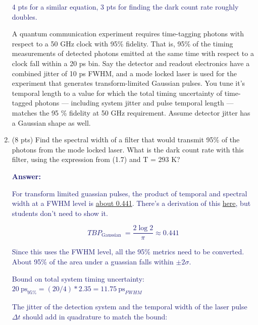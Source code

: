 \documentclass[11pt]{caltech_thesis} %
\begin{document}
\begin{enumerate}
  \textcolor{midnightblue}{4 pts for a similar equation, 3 pts for
  finding the dark count rate roughly doubles. }

  A quantum communication experiment requires time-tagging photons with
  respect to a 50 GHz clock with 95\% fidelity. That is, 95\% of the
  timing measurements of detected photons emitted at the same time with
  respect to a clock fall within a 20 ps bin. Say the detector and
  readout electronics have a combined jitter of 10 ps FWHM, and a mode
  locked laser is used for the experiment that generates
  transform-limited Gaussian pulses. You tune it's temporal length to a
  value for which the total timing uncertainty of time-tagged photons
  --- including system jitter and pulse temporal length --- matches the
  95 \% fidelity at 50 GHz requirement. Assume detector jitter has a
  Gaussian shape as well.
\item
  (8 pts) Find the spectral width of a filter that would transmit 95\%
  of the photons from the mode locked laser. What is the dark count rate
  with this filter, using the expression from (1.7) and T = 293 K?

  \textcolor{midnightblue}{ \textbf{Answer:} }

  \textcolor{midnightblue}{For transform limited guassian pulses, the
  product of temporal and spectral width at a FWHM level is
  \href{https://www.lasercalculator.com/transform-limited-pulse-calculator/}{about
  0.441}. There's a derivation of this
  \href{https://www.physicsforums.com/threads/time-bandwidth-product-ideal-mode-locking.171404/post-1339948}{here},
  but students don't need to show it. }

  \textcolor{midnightblue}{

  $$T B P_{\text {Gaussian }}=\frac{2 \log 2}{\pi} \approx 0.441$$

  }

  \textcolor{midnightblue}{ Since this uses the FWHM level, all the 95\%
  metrics need to be converted. About 95\% of the area under a guassian
  falls within $\pm 2 \sigma$. }

  \textcolor{midnightblue}{ Bound on total system timing uncertainty:
  $20~\text{ps}_{95\%} = (20/4)*2.35 = 11.75~\text{ps}_{FWHM}$ }

  \textcolor{midnightblue}{ The jitter of the detection system and the
  temporal width of the laser pulse $\Delta t$ should add in quadrature
  to match the bound: }

  \textcolor{midnightblue}{

}
\end{enumerate}
\end{document}
